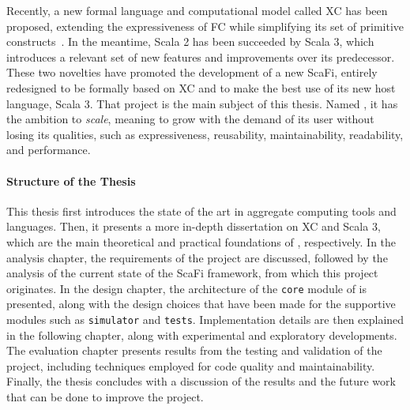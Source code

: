 Recently, a new formal language and computational model called \ac{XC} has been proposed, extending the expressiveness of \ac{FC} while simplifying its set of primitive constructs~\cite{xc}.
%
In the meantime, Scala 2 has been succeeded by Scala 3, which introduces a relevant set of new features and improvements over its predecessor.
%
These two novelties have promoted the development of a new ScaFi, entirely redesigned to be formally based on \ac{XC} and to make the best use of its new host language, Scala 3.
%
That project is the main subject of this thesis.
%
Named \quotes{\this}, it has the ambition to \textit{scale}, meaning to grow with the demand of its user without losing its qualities, such as expressiveness, reusability, maintainability, readability, and performance.


\paragraph{Structure of the Thesis} This thesis first introduces the state of the art in aggregate computing tools and languages.
%
Then, it presents a more in-depth dissertation on \ac{XC} and Scala 3, which are the main theoretical and practical foundations of \this, respectively.
%
In the analysis chapter, the requirements of the project are discussed, followed by the analysis of the current state of the ScaFi framework, from which this project originates.
%
In the design chapter, the architecture of the \texttt{core} module of \this is presented, along with the design choices that have been made for the supportive modules such as \texttt{simulator} and \texttt{tests}.
%
Implementation details are then explained in the following chapter, along with experimental and exploratory developments.
%
The evaluation chapter presents results from the testing and validation of the project, including techniques employed for code quality and maintainability.
%
Finally, the thesis concludes with a discussion of the results and the future work that can be done to improve the project.

